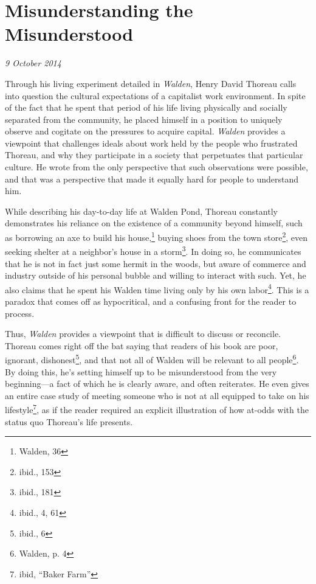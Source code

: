\section{Misunderstanding the Misunderstood}

\textit{9 October 2014}

Through his living experiment detailed in \textit{Walden}, Henry David Thoreau
calls into question the cultural expectations of a capitalist work environment.
In spite of the fact that he spent that period of his life living physically and
socially separated from the community, he placed himself in a position to
uniquely observe and cogitate on the pressures to acquire capital.
\textit{Walden} provides a viewpoint that challenges ideals about work held by
the people who frustrated Thoreau, and why they participate in a society that
perpetuates that particular culture. He wrote from the only perspective that
such observations were possible, and that was a perspective that made it equally
hard for people to understand him.

While describing his day-to-day life at Walden Pond, Thoreau constantly
demonstrates his reliance on the existence of a community beyond himself, such
as borrowing an axe to build his house,\footnote{Walden, 36} buying shoes from
the town store\footnote{ibid., 153}, even seeking shelter at a neighbor's house
in a storm\footnote{ibid., 181}. In doing so, he communicates that he is not in
fact just some hermit in the woods, but aware of commerce and industry outside
of his personal bubble and willing to interact with such. Yet, he also claims
that he spent his Walden time living only by his own labor\footnote{ibid., 4,
61}. This is a paradox that comes off as hypocritical, and a confusing front for
the reader to process.

Thus, \textit{Walden} provides a viewpoint that is difficult to discuss or
reconcile. Thoreau comes right off the bat saying that readers of his
book are poor, ignorant, dishonest\footnote{ibid., 6}, and that not all of
Walden will be relevant to all people\footnote{Walden, p. 4}. By doing this,
he's setting himself up to be misunderstood from the very beginning---a fact of
which he is clearly aware, and often reiterates. He even gives an entire case
study of meeting someone who is not at all equipped to take on his
lifestyle\footnote{ibid,  ``Baker Farm''}, as if the reader required an explicit
illustration of how at-odds with the status quo Thoreau's life presents.

